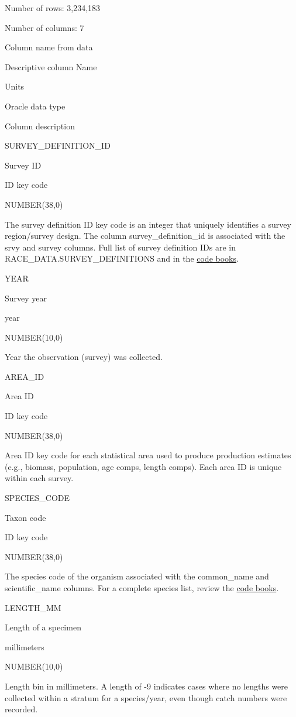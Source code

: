 \documentclass[
  letterpaper,
  oneside,
  open=any]{scrbook}
\begin{document}
Number of rows: 3,234,183

Number of columns: 7

Column name from data

Descriptive column Name

Units

Oracle data type

Column description

SURVEY\_DEFINITION\_ID

Survey ID

ID key code

NUMBER(38,0)

The survey definition ID key code is an integer that uniquely identifies
a survey region/survey design. The column survey\_definition\_id is
associated with the srvy and survey columns. Full list of survey
definition IDs are in RACE\_DATA.SURVEY\_DEFINITIONS and in the
\href{https://www.fisheries.noaa.gov/resource/document/groundfish-survey-species-code-manual-and-data-codes-manual}{code
books}.

YEAR

Survey year

year

NUMBER(10,0)

Year the observation (survey) was collected.

AREA\_ID

Area ID

ID key code

NUMBER(38,0)

Area ID key code for each statistical area used to produce production
estimates (e.g., biomass, population, age comps, length comps). Each
area ID is unique within each survey.

SPECIES\_CODE

Taxon code

ID key code

NUMBER(38,0)

The species code of the organism associated with the common\_name and
scientific\_name columns. For a complete species list, review the
\href{https://www.fisheries.noaa.gov/resource/document/groundfish-survey-species-code-manual-and-data-codes-manual}{code
books}.

LENGTH\_MM

Length of a specimen

millimeters

NUMBER(10,0)

Length bin in millimeters. A length of -9 indicates cases where no
lengths were collected within a stratum for a species/year, even though
catch numbers were recorded.
\end{document}
